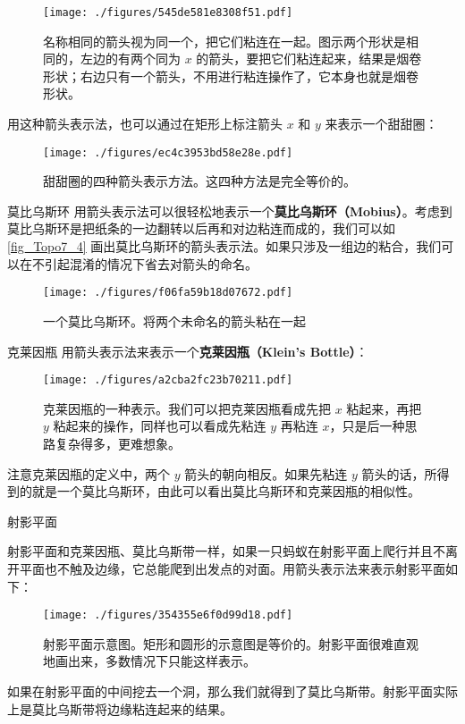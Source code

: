 \begin{figure}[ht]
\centering
\texttt{[image: ./figures/545de581e8308f51.pdf]}
\caption{名称相同的箭头视为同一个，把它们粘连在一起。图示两个形状是相同的，左边的有两个同为 $x$ 的箭头，要把它们粘连起来，结果是烟卷形状；右边只有一个箭头，不用进行粘连操作了，它本身也就是烟卷形状。} \label{fig_Topo7_2}
\end{figure}

用这种箭头表示法，也可以通过在矩形上标注箭头 $x$ 和 $y$ 来表示一个甜甜圈：

\begin{figure}[ht]
\centering
\texttt{[image: ./figures/ec4c3953bd58e28e.pdf]}
\caption{甜甜圈的四种箭头表示方法。这四种方法是完全等价的。} \label{fig_Topo7_3}
\end{figure}

\begin{example}{莫比乌斯环}
用箭头表示法可以很轻松地表示一个\textbf{莫比乌斯环（Mobius）}。考虑到莫比乌斯环是把纸条的一边翻转以后再和对边粘连而成的，我们可以如\autoref{fig_Topo7_4} 画出莫比乌斯环的箭头表示法。如果只涉及一组边的粘合，我们可以在不引起混淆的情况下省去对箭头的命名。

\begin{figure}[ht]
\centering
\texttt{[image: ./figures/f06fa59b18d07672.pdf]}
\caption{一个莫比乌斯环。将两个未命名的箭头粘在一起} \label{fig_Topo7_4}
\end{figure}

\end{example}



\begin{example}{克莱因瓶}
用箭头表示法来表示一个\textbf{克莱因瓶（Klein's Bottle）}：
\begin{figure}[ht]
\centering
\texttt{[image: ./figures/a2cba2fc23b70211.pdf]}
\caption{克莱因瓶的一种表示。我们可以把克莱因瓶看成先把 $x$ 粘起来，再把 $y$ 粘起来的操作，同样也可以看成先粘连 $y$ 再粘连 $x$，只是后一种思路复杂得多，更难想象。} \label{fig_Topo7_5}
\end{figure}

注意克莱因瓶的定义中，两个 $y$ 箭头的朝向相反。如果先粘连 $y$ 箭头的话，所得到的就是一个莫比乌斯环，由此可以看出莫比乌斯环和克莱因瓶的相似性。

\end{example}

\begin{example}{射影平面}

射影平面和克莱因瓶、莫比乌斯带一样，如果一只蚂蚁在射影平面上爬行并且不离开平面也不触及边缘，它总能爬到出发点的对面。用箭头表示法来表示射影平面如下：

\begin{figure}[ht]
\centering
\texttt{[image: ./figures/354355e6f0d99d18.pdf]}
\caption{射影平面示意图。矩形和圆形的示意图是等价的。射影平面很难直观地画出来，多数情况下只能这样表示。} \label{fig_Topo7_8}
\end{figure}

如果在射影平面的中间挖去一个洞，那么我们就得到了莫比乌斯带。射影平面实际上是莫比乌斯带将边缘粘连起来的结果。

\end{example}

